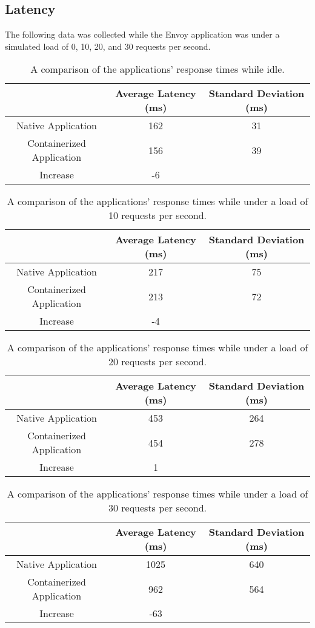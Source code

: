 \documentclass{article}
\begin{document}
\subsection{Latency}
The following data was collected while the Envoy application was under a simulated load of 0, 10, 20, and 30 requests per second.

\begin{table}[H]
\begin{tabular}{ |c|c|c| }
 \hline
 & Average Latency (ms) & Standard Deviation (ms) \\
 \hline
 Native Application & 162 & 31 \\
 \hline
 Containerized Application & 156 & 39 \\
 \hline\hline
 Increase & -6 & \\
 \hline
\end{tabular}
\caption{A comparison of the applications' response times while idle.}
\label{idle-latency}
\end{table}

\begin{table}[H]
\begin{tabular}{ |c|c|c| }
 \hline
 & Average Latency (ms) & Standard Deviation (ms) \\
 \hline
 Native Application & 217 & 75 \\
 \hline
 Containerized Application & 213 & 72 \\
 \hline\hline
 Increase & -4 & \\
 \hline
\end{tabular}
\caption{A comparison of the applications' response times while under a load of 10 requests per second.}
\label{latency-under-load-10}
\end{table}

\begin{table}[H]
\begin{tabular}{ |c|c|c| }
 \hline
 & Average Latency (ms) & Standard Deviation (ms) \\
 \hline
 Native Application & 453 & 264 \\
 \hline
 Containerized Application & 454 & 278 \\
 \hline\hline
 Increase & 1 & \\
 \hline
\end{tabular}
\caption{A comparison of the applications' response times while under a load of 20 requests per second.}
\label{latency-under-load-20}
\end{table}

\begin{table}[H]
\begin{tabular}{ |c|c|c| }
 \hline
 & Average Latency (ms) & Standard Deviation (ms) \\
 \hline
 Native Application & 1025 & 640 \\
 \hline
 Containerized Application & 962 & 564 \\
 \hline\hline
 Increase & -63 & \\
 \hline
\end{tabular}
\caption{A comparison of the applications' response times while under a load of 30 requests per second.}
\label{latency-under-load-30}
\end{table}
\end{document}
